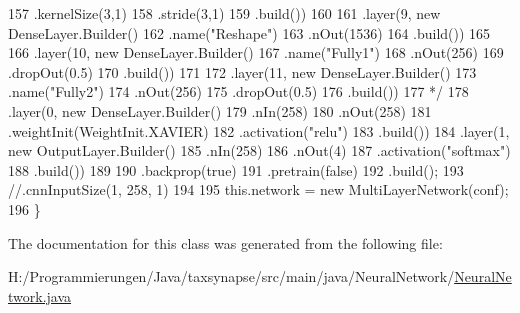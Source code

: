 \begin{DoxyCode}
157 \textcolor{comment}{                        .kernelSize(3,1)}
158 \textcolor{comment}{                        .stride(3,1)}
159 \textcolor{comment}{                        .build())}
160 \textcolor{comment}{                }
161 \textcolor{comment}{                .layer(9, new DenseLayer.Builder()}
162 \textcolor{comment}{                        .name("Reshape")}
163 \textcolor{comment}{                        .nOut(1536)}
164 \textcolor{comment}{                        .build())}
165 \textcolor{comment}{                }
166 \textcolor{comment}{                .layer(10, new DenseLayer.Builder()}
167 \textcolor{comment}{                        .name("Fully1")}
168 \textcolor{comment}{                        .nOut(256)}
169 \textcolor{comment}{                        .dropOut(0.5)}
170 \textcolor{comment}{                        .build())}
171 \textcolor{comment}{                }
172 \textcolor{comment}{                .layer(11, new DenseLayer.Builder()}
173 \textcolor{comment}{                        .name("Fully2")}
174 \textcolor{comment}{                        .nOut(256)}
175 \textcolor{comment}{                        .dropOut(0.5)}
176 \textcolor{comment}{                        .build())}
177 \textcolor{comment}{                */}
178                 .layer(0, \textcolor{keyword}{new} DenseLayer.Builder()
179                         .nIn(258)
180                         .nOut(258)
181                         .weightInit(WeightInit.XAVIER)
182                         .activation(\textcolor{stringliteral}{"relu"})
183                         .build())
184                 .layer(1, \textcolor{keyword}{new} OutputLayer.Builder()
185                         .nIn(258)
186                         .nOut(4)
187                         .activation(\textcolor{stringliteral}{"softmax"})
188                         .build())
189                         
190                 .backprop(\textcolor{keyword}{true})
191                 .pretrain(\textcolor{keyword}{false})
192                 .build();
193                 \textcolor{comment}{//.cnnInputSize(1, 258, 1)}
194         
195         this.network = \textcolor{keyword}{new} MultiLayerNetwork(conf);
196     \}
\end{DoxyCode}


The documentation for this class was generated from the following file\-:\begin{DoxyCompactItemize}
\item 
H\-:/\-Programmierungen/\-Java/taxsynapse/src/main/java/\-Neural\-Network/\hyperlink{_neural_network_8java}{Neural\-Network.\-java}\end{DoxyCompactItemize}
